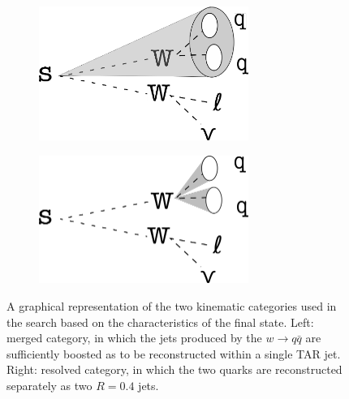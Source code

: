 \begin{figure}[htbp]
	\centering
	\begin{subfigure}[t]{0.45\textwidth}
	\centering
	\includegraphics[width=0.75\textwidth]{Figures/5/merged.pdf}
	\end{subfigure}
	\begin{subfigure}[t]{.45\textwidth}
	\centering
	\includegraphics[width=0.75\textwidth]{Figures/5/resolved.png}
	\end{subfigure}
	\caption{A graphical representation of the two kinematic categories used in the search based on the characteristics of the final state. Left: merged category, in which the jets produced by the \(w\rightarrow q\bar{q}\) are sufficiently boosted as to be reconstructed within a single \largeR TAR jet. Right: resolved category, in which the two quarks are reconstructed separately as two \smallR \akt \(R=0.4\) jets.}
	\label{fig:categories}
\end{figure}


